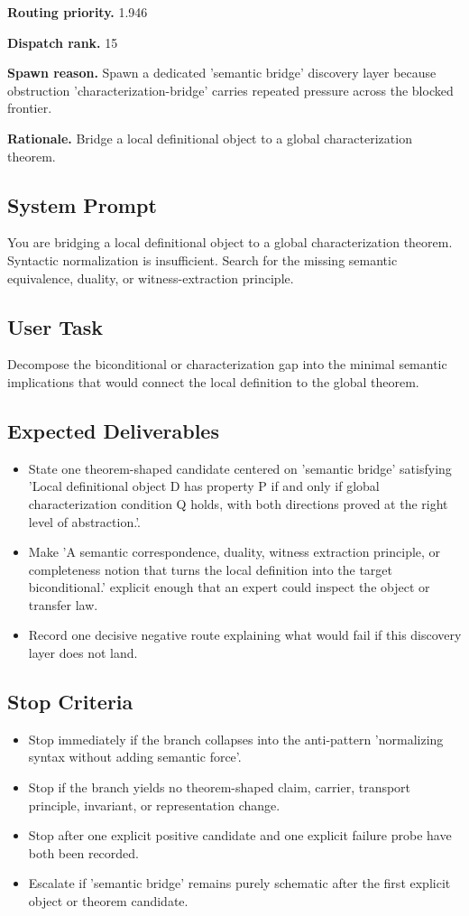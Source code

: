 \documentclass[11pt]{article}
\begin{document}
\textbf{Routing priority.} 1.946

\textbf{Dispatch rank.} 15

\textbf{Spawn reason.} Spawn a dedicated 'semantic bridge' discovery layer because obstruction 'characterization-bridge' carries repeated pressure across the blocked frontier.

\textbf{Rationale.} Bridge a local definitional object to a global characterization theorem.

\subsection*{System Prompt}
You are bridging a local definitional object to a global characterization theorem. Syntactic normalization is insufficient. Search for the missing semantic equivalence, duality, or witness-extraction principle.

\subsection*{User Task}
Decompose the biconditional or characterization gap into the minimal semantic implications that would connect the local definition to the global theorem.

\subsection*{Expected Deliverables}
\begin{itemize}[leftmargin=*,itemsep=0.2em]
\item State one theorem-shaped candidate centered on 'semantic bridge' satisfying 'Local definitional object D has property P if and only if global characterization condition Q holds, with both directions proved at the right level of abstraction.'.
\item Make 'A semantic correspondence, duality, witness extraction principle, or completeness notion that turns the local definition into the target biconditional.' explicit enough that an expert could inspect the object or transfer law.
\item Record one decisive negative route explaining what would fail if this discovery layer does not land.
\end{itemize}
\subsection*{Stop Criteria}
\begin{itemize}[leftmargin=*,itemsep=0.2em]
\item Stop immediately if the branch collapses into the anti-pattern 'normalizing syntax without adding semantic force'.
\item Stop if the branch yields no theorem-shaped claim, carrier, transport principle, invariant, or representation change.
\item Stop after one explicit positive candidate and one explicit failure probe have both been recorded.
\item Escalate if 'semantic bridge' remains purely schematic after the first explicit object or theorem candidate.
\end{itemize}
\end{document}
